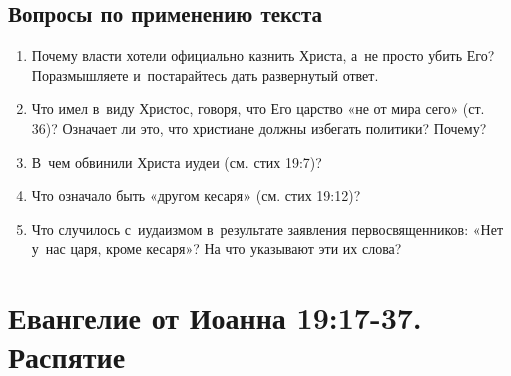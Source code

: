 \documentclass[a4paper,12pt]{article}
\begin{document}
\subsection*{Вопросы по применению текста} 
\begin{enumerate}
    \item Почему власти хотели официально казнить Христа, а~не просто убить Его? Поразмышляете и~постарайтесь дать развернутый ответ. 
    
    \myline
    
    \myline
    \item Что имел в~виду Христос, говоря, что Его царство «не от мира сего» (ст. 36)? Означает ли это, что христиане должны избегать политики? Почему? 
    
    \myline
    
    \myline
    \item В~чем обвинили Христа иудеи (см. стих 19:7)?
    
    \myline
    
    \myline
    \item Что означало быть «другом кесаря» (см. стих 19:12)? 
    
    \myline
    
    \myline
    \item Что случилось с~иудаизмом в~результате заявления первосвященников: «Нет у~нас царя, кроме кесаря»? На что указывают эти их слова? 
    
    \myline
    
    \myline
\end{enumerate}



\section{Евангелие от Иоанна 19:17-37. Распятие}
\end{document}
